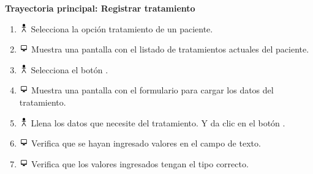 \textbf{Trayectoria principal: Registrar tratamiento}  
\begin{enumerate}
\item \includegraphics[height=1em]{pictures/actor.png} Selecciona la opción tratamiento de un paciente.
\item \includegraphics[height=1em]{pictures/sistema.png} Muestra una pantalla con el listado de tratamientos actuales del paciente.
\item \includegraphics[height=1em]{pictures/actor.png} Selecciona el botón .
\item \includegraphics[height=1em]{pictures/sistema.png} Muestra una pantalla con el formulario para cargar los datos del tratamiento.
\item \includegraphics[height=1em]{pictures/actor.png} Llena los datos que necesite del tratamiento. Y da clic en el botón  .
\item \includegraphics[height=1em]{pictures/sistema.png} Verifica que se hayan ingresado valores en el campo de texto.
\item \includegraphics[height=1em]{pictures/sistema.png} Verifica que los valores ingresados tengan el tipo correcto.
\end{enumerate} \bigskip

